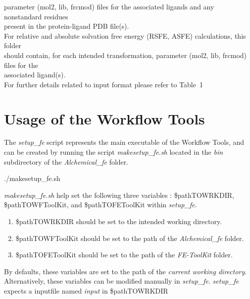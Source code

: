\documentclass[11pt,letterpaper,titlepage]{article}
\begin{document}
\begin{enumerate}
\begin{itemize}
				parameter (mol2, lib, frcmod) files for the associated ligands and any nonstandard residues  \\
				present in the protein-ligand PDB file(s).  \\
				For relative and absolute solvation free energy (RSFE, ASFE) calculations, this folder \\
				should contain, for each intended transformation, parameter (mol2, lib, frcmod) files for the  \\
				associated ligand(s). \\
				For further details related to input format please refer to Table~1 \\
		\end{itemize}
\end{enumerate}

\vspace{0.1cm}
\section{Usage of the Workflow Tools}
\vspace{0.1cm}

The \textit{setup\_fe} script represents the main executable of the Workflow Tools, 
and can be 
created by running the script \textit{makesetup\_fe.sh} located in the \textit{bin} subdirectory
of the \textit{Alchemical\_fe} folder. 

\vspace{0.1cm}
\centerline{./makesetup\_fe.sh}
\vspace{0.1cm}

\textit{makesetup\_fe.sh} help set the following three variables : \${pathTOWRKDIR}, 
\${pathTOWFToolKit}, and \${pathTOFEToolKit} within \textit{setup\_fe}. 
\begin{enumerate}
	\item{\${pathTOWRKDIR} should be set to the intended working directory.}
	\item{\${pathTOWFToolKit} should be set to the path of the \textit{Alchemical\_fe} folder.}
	\item{\${pathTOFEToolKit} should be set to the path of the \textit{FE-ToolKit} folder.}
\end{enumerate}
By defaults, these variables are set to the path of the \textit{current working directory}. Alternatively, these variables 
can be modified manually in \textit{setup\_fe}. 
\textit{setup\_fe} expects a inputfile named \textit{input} in \${pathTOWRKDIR}

\vspace{0.1cm}
\end{document}
